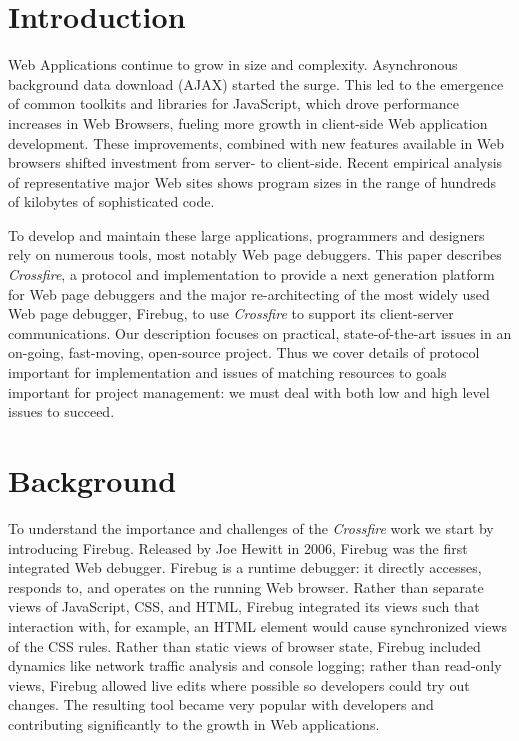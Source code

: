 
\section{Introduction}
Web Applications continue to grow in size and complexity. Asynchronous
background data download (AJAX) started the surge. This led to the emergence of
common toolkits and libraries for JavaScript, which drove  performance increases
in Web Browsers, fueling more growth in client-side Web application development.
These improvements, combined with new features available in Web browsers shifted
investment from server- to client-side. Recent empirical analysis of
representative
 major Web sites shows program sizes in the range of hundreds of kilobytes of
sophisticated code.\cite{VitekDynamicJS2010}

To develop and maintain these large applications, programmers and designers rely
on numerous tools, most notably Web page debuggers. This paper describes
\textit{Crossfire}, a protocol and implementation to provide a next generation
platform for Web page debuggers and the major re-architecting of the most widely used Web
page debugger, Firebug, to use \textit{Crossfire} to support its client-server
communications. Our description focuses on practical, state-of-the-art issues in
an on-going, fast-moving, open-source project. Thus we cover details of protocol
important for implementation and issues of matching resources to goals important
for project management: we must deal with both low and high level issues to
succeed.

\section{Background}
To understand the importance and challenges of the \textit{Crossfire} work we
start by introducing Firebug. Released by Joe Hewitt in 2006, Firebug was the
first integrated Web debugger. Firebug is a runtime debugger: it directly
accesses, responds to, and operates on the running Web browser.  Rather than
separate views of JavaScript, CSS, and HTML, Firebug integrated its views such
that interaction with, for example, an HTML element would cause synchronized
views of the CSS rules. Rather than static
 views of browser state, Firebug included dynamics like network traffic analysis
 and console logging; rather
than read-only views, Firebug allowed live edits where possible so developers
could try out changes. The resulting tool became very popular with developers
and contributing significantly to the growth in Web applications.

